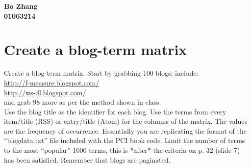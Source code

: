 \documentclass{article}
\begin{document}
		\begin{center}\textbf{Bo Zhang\\01063214}
		\end{center}
		\section{Create a blog-term matrix}
		Create a blog-term matrix. Start by grabbing 100 blogs; include:\\
		\indent\url{http://f-measure.blogspot.com/}\\
		\indent\url{http://ws-dl.blogspot.com/}\\
		and grab 98 more as per the method shown in class.\\
		\indent Use the blog title as the identifier for each blog. Use the terms from every item/title (RSS) or entry/title (Atom) for the columns of the matrix. The values are the frequency of occurrence. Essentially you are replicating the format of the ``blogdata.txt'' file included with the PCI book code. Limit the number of terms to the most ``popular'' 1000 terms, this is *after* the criteria on p. 32 (slide 7) has been satisfied. Remember that blogs are paginated.\\
\end{document}
